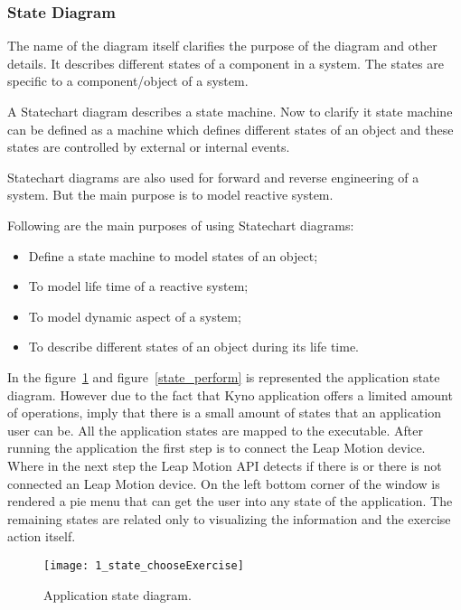 \subsubsection{State Diagram}
The name of the diagram itself clarifies the purpose of the diagram and other details. It describes different states of a component in a system. The states are specific to a component/object of a system.

A Statechart diagram describes a state machine. Now to clarify it state machine can be defined as a machine which defines different states of an object and these states are controlled by external or internal events.

Statechart diagrams are also used for forward and reverse engineering of a system. But the main purpose is to model reactive system.


Following are the main purposes of using Statechart diagrams:

\begin{itemize}
\item Define a state machine to model states of an object;
\item To model life time of a reactive system;
\item To model dynamic aspect of a system;
\item To describe different states of an object during its life time.
\end{itemize}

\vspace{0.2cm}

In the  \mbox{figure \ref{state_choose}} and  \mbox{figure \ref{state_perform}} is represented the application state diagram.
 However due to the fact that Kyno application offers a limited amount of operations, imply that there is a small amount of states that an application user can be. All the application states are mapped to the executable. After running the application the first step is to connect the Leap Motion device. Where in the next step the Leap Motion API detects if there is or there is not connected an Leap Motion device. On the left bottom corner of the window is rendered a pie menu that can get the user into any state of the application. The remaining states are related only to visualizing the information and the exercise action itself.


\begin{figure}[!h]
\centering
\texttt{[image: 1\_state\_chooseExercise]}
\caption{Application state diagram.}\label{state_choose}
\end{figure}


